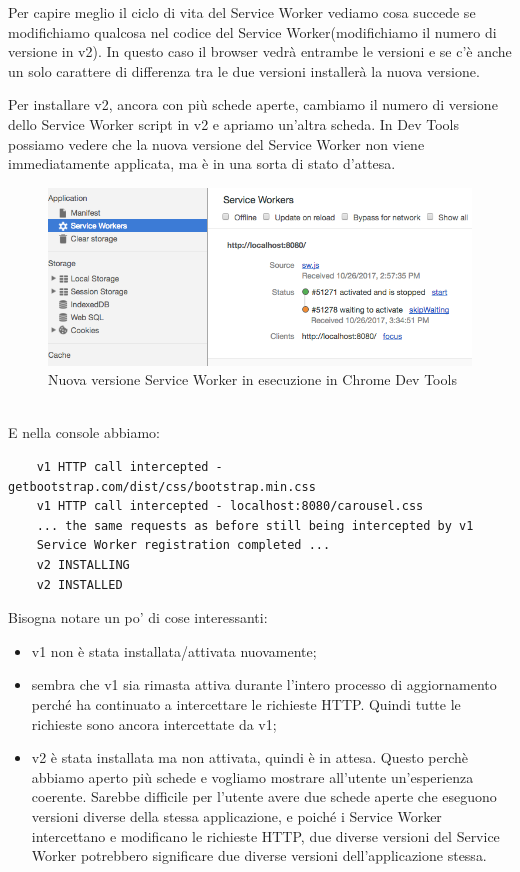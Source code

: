 \documentclass[italian]{article}
\begin{document}
Per capire meglio il ciclo di vita del Service Worker vediamo cosa succede se modifichiamo qualcosa nel codice del Service Worker(modifichiamo il numero di versione in v2). In questo caso il browser vedrà entrambe le versioni e se c'è anche un solo carattere di differenza tra le due versioni installerà la nuova versione.

Per installare v2, ancora con più schede aperte, cambiamo il numero di versione dello Service Worker script in v2 e apriamo un'altra scheda. In Dev Tools possiamo vedere che la nuova versione del Service Worker non viene immediatamente applicata, ma è in una sorta di stato d'attesa.
\begin{figure}[h]
	\centering
	\includegraphics[width=1\linewidth]{DevTools2}
	\caption{Nuova versione Service Worker in esecuzione in Chrome Dev Tools}
	\label{fig:Nuova versione Service Worker in esecuzione in Chrome Dev Tools}
\end{figure}\\
E nella console abbiamo:
\begin{lstlisting}
	v1 HTTP call intercepted - getbootstrap.com/dist/css/bootstrap.min.css
	v1 HTTP call intercepted - localhost:8080/carousel.css
	... the same requests as before still being intercepted by v1
	Service Worker registration completed ...
	v2 INSTALLING 
	v2 INSTALLED
\end{lstlisting}
Bisogna notare un po' di cose interessanti:
\begin{itemize}
\item v1 non è stata installata/attivata nuovamente;
\item sembra che v1 sia rimasta attiva durante l'intero processo di aggiornamento perché ha continuato a intercettare le richieste HTTP. Quindi tutte le richieste sono ancora intercettate da v1;
\item v2 è stata installata ma non attivata, quindi è in attesa. Questo perchè abbiamo aperto più schede e vogliamo mostrare all'utente un'esperienza coerente. Sarebbe difficile per l'utente avere due schede aperte che eseguono versioni diverse della stessa applicazione, e poiché i Service Worker intercettano e modificano le richieste HTTP, due diverse versioni del Service Worker potrebbero significare due diverse versioni dell'applicazione stessa.
\end{itemize}
\end{document}
